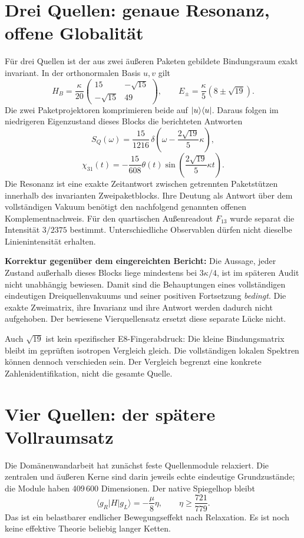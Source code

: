 \section{Drei Quellen: genaue Resonanz, offene Globalität}
Für drei Quellen ist der aus zwei äußeren Paketen gebildete Bindungsraum exakt invariant. In der orthonormalen Basis $u,v$ gilt
\[
 H_B=\frac\kappa{20}\begin{pmatrix}15&-\sqrt{15}\\-\sqrt{15}&49\end{pmatrix},
 \qquad E_\pm=\frac\kappa5(8\pm\sqrt{19}).
\]
Die zwei Paketprojektoren komprimieren beide auf $\lvert u\rangle\langle u\rvert$. Daraus folgen im niedrigeren Eigenzustand dieses Blocks die berichteten Antworten
\[
 S_Q(\omega)=\frac{15}{1216}\,
 \delta\!\left(\omega-\frac{2\sqrt{19}}5\kappa\right),
\]
\[
 \chi_{31}(t)=-\frac{15}{608}\theta(t)
 \sin\!\left(\frac{2\sqrt{19}}5\kappa t\right).
\]
Die Resonanz ist eine exakte Zeitantwort zwischen getrennten Paketstützen innerhalb des invarianten Zweipaketblocks. Ihre Deutung als Antwort über dem vollständigen Vakuum benötigt den nachfolgend genannten offenen Komplementnachweis. Für den quartischen Außenreadout $F_{13}$ wurde separat die Intensität $3/2375$ bestimmt. Unterschiedliche Observablen dürfen nicht dieselbe Linienintensität erhalten. 

\textbf{Korrektur gegenüber dem eingereichten Bericht:} Die Aussage, jeder Zustand außerhalb dieses Blocks liege mindestens bei $3\kappa/4$, ist im späteren Audit nicht unabhängig bewiesen. Damit sind die Behauptungen eines vollständigen eindeutigen Dreiquellenvakuums und seiner positiven Fortsetzung \emph{bedingt}. Die exakte Zweimatrix, ihre Invarianz und ihre Antwort werden dadurch nicht aufgehoben. Der bewiesene Vierquellensatz ersetzt diese separate Lücke nicht. 

Auch $\sqrt{19}$ ist kein spezifischer E8-Fingerabdruck: Die kleine Bindungsmatrix bleibt im geprüften isotropen Vergleich gleich. Die vollständigen lokalen Spektren können dennoch verschieden sein. Der Vergleich begrenzt eine konkrete Zahlenidentifikation, nicht die gesamte Quelle.

\section{Vier Quellen: der spätere Vollraumsatz}
Die Domänenwandarbeit hat zunächst feste Quellenmodule relaxiert. Die zentralen und äußeren Kerne sind darin jeweils echte eindeutige Grundzustände; die Module haben 409\,600 Dimensionen. Der native Spiegelhop bleibt
\[
 \langle g_R|H|g_L\rangle=-\frac\mu8\eta,\qquad
 \eta\ge\frac{721}{779}.
\]
Das ist ein belastbarer endlicher Bewegungseffekt nach Relaxation. Es ist noch keine effektive Theorie beliebig langer Ketten. 

